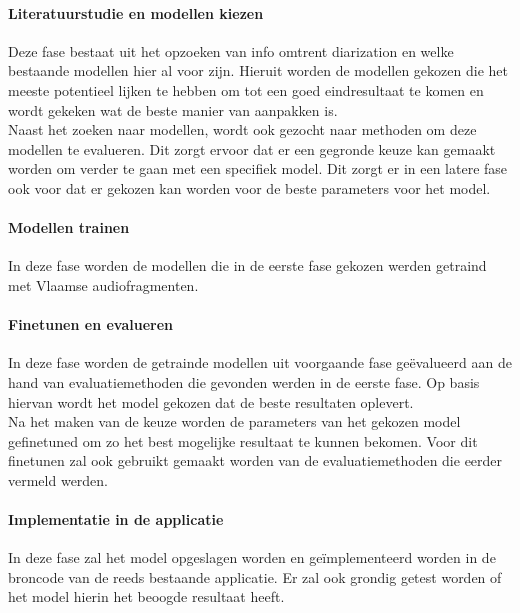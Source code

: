 \paragraph{Literatuurstudie en modellen kiezen}
Deze fase bestaat uit het opzoeken van info omtrent diarization en welke bestaande modellen hier al voor zijn. Hieruit worden de modellen gekozen die het meeste potentieel lijken te hebben om tot een goed eindresultaat te komen en wordt gekeken wat de beste manier van aanpakken is.\\
Naast het zoeken naar modellen, wordt ook gezocht naar methoden om deze modellen te evalueren. Dit zorgt ervoor dat er een gegronde keuze kan gemaakt worden om verder te gaan met een specifiek model. Dit zorgt er in een latere fase ook voor dat er gekozen kan worden voor de beste parameters voor het model.

\paragraph{Modellen trainen}
In deze fase worden de modellen die in de eerste fase gekozen werden getraind met Vlaamse audiofragmenten. 

\paragraph{Finetunen en evalueren}
In deze fase worden de getrainde modellen uit voorgaande fase geëvalueerd aan de hand van evaluatiemethoden die gevonden werden in de eerste fase. Op basis hiervan wordt het model gekozen dat de beste resultaten oplevert.\\
Na het maken van de keuze worden de parameters van het gekozen model gefinetuned om zo het best mogelijke resultaat te kunnen bekomen. Voor dit finetunen zal ook gebruikt gemaakt worden van de evaluatiemethoden die eerder vermeld werden.

\paragraph{Implementatie in de applicatie}
In deze fase zal het model opgeslagen worden en geïmplementeerd worden in de broncode van de reeds bestaande applicatie. Er zal ook grondig getest worden of het model hierin het beoogde resultaat heeft.